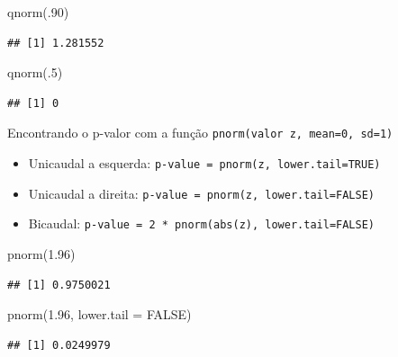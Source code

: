 \documentclass[
]{article}
\newenvironment{Shaded}{\begin{snugshade}}{\end{snugshade}}
\newcommand{\AttributeTok}[1]{\textcolor[rgb]{0.77,0.63,0.00}{#1}}
\newcommand{\ConstantTok}[1]{\textcolor[rgb]{0.00,0.00,0.00}{#1}}
\newcommand{\DecValTok}[1]{\textcolor[rgb]{0.00,0.00,0.81}{#1}}
\newcommand{\FloatTok}[1]{\textcolor[rgb]{0.00,0.00,0.81}{#1}}
\newcommand{\FunctionTok}[1]{\textcolor[rgb]{0.00,0.00,0.00}{#1}}
\newcommand{\NormalTok}[1]{#1}
\providecommand{\tightlist}{%
  \setlength{\itemsep}{0pt}\setlength{\parskip}{0pt}}
\begin{document}
\begin{Shaded}
\begin{Highlighting}[]
\FunctionTok{qnorm}\NormalTok{(.}\DecValTok{90}\NormalTok{)}
\end{Highlighting}
\end{Shaded}

\begin{verbatim}
## [1] 1.281552
\end{verbatim}

\begin{Shaded}
\begin{Highlighting}[]
\FunctionTok{qnorm}\NormalTok{(.}\DecValTok{5}\NormalTok{)}
\end{Highlighting}
\end{Shaded}

\begin{verbatim}
## [1] 0
\end{verbatim}

Encontrando o p-valor com a função
\texttt{pnorm(valor\ z,\ mean=0,\ sd=1)}

\begin{itemize}
\tightlist
\item
  Unicaudal a esquerda: \texttt{p-value\ =\ pnorm(z,\ lower.tail=TRUE)}
\item
  Unicaudal a direita: \texttt{p-value\ =\ pnorm(z,\ lower.tail=FALSE)}
\item
  Bicaudal: \texttt{p-value\ =\ 2\ *\ pnorm(abs(z),\ lower.tail=FALSE)}
\end{itemize}

\begin{Shaded}
\begin{Highlighting}[]
\FunctionTok{pnorm}\NormalTok{(}\FloatTok{1.96}\NormalTok{)}
\end{Highlighting}
\end{Shaded}

\begin{verbatim}
## [1] 0.9750021
\end{verbatim}

\begin{Shaded}
\begin{Highlighting}[]
\FunctionTok{pnorm}\NormalTok{(}\FloatTok{1.96}\NormalTok{, }\AttributeTok{lower.tail =} \ConstantTok{FALSE}\NormalTok{)}
\end{Highlighting}
\end{Shaded}

\begin{verbatim}
## [1] 0.0249979
\end{verbatim}
\end{document}
